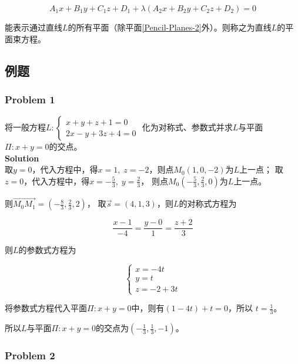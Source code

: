 \documentclass[12pt, a4paper]{article}
\numberwithin{equation}{section}
\begin{document}
    \begin{equation}
        A_1 x+B_1 y+C_1 z+D_1+\lambda\left(A_2x+B_2y+C_2z+D_2\right) = 0
    \end{equation}

    能表示通过直线\(L\)的所有平面（除平面\ref{Pencil-Planes-2}外）。则称之为直线\(L\)的平面束方程。

\subsection{例题}

\subsubsection{Problem 1}

    将一般方程$L:\left\{\begin{array}{l}x+y+z+1=0 \\ 2 x-y+3z+4=0\end{array}\right.$
    化为对称式、参数式并求\(L\)与平面\(\Pi: x + y =0\)的交点。
    \\

    \textbf{Solution}
    \\

    取\(y = 0\)，代入方程中，得\(x=1,\; z=-2\)，则点\(M_{0}\left(1,0,-2\right)\)为\(L\)上一点；
    取\(z = 0\)，代入方程中，得\(x=-\frac{5}{3},\; y=\frac{2}{3}\)，
    则点\(M_{0}\left(-\frac{5}{3},\frac{2}{3},0\right)\)为\(L\)上一点。

    则\(\overrightarrow{M_{0}M_{1}} = \left(-\frac{8}{3},\frac{2}{3},2\right)\)，
    取\(\overrightarrow{s} = \left(4,1,3\right)\)，则\(L\)的对称式方程为

    \[
        \frac{x-1}{-4}=\frac{y-0}{1}=\frac{z+2}{3}
    \]

    则\(L\)的参数式方程为

    $$
        \left\{\begin{array}{l}
        x=-4 t \\
        y=t \\
        z=-2+3 t
        \end{array}\right.
    $$

    将参数式方程代入平面\(\Pi: x + y =0\)中，则有\(\left(1-4t\right) + t = 0\)，所以
    \(t = \frac{1}{3}\)。

    所以\(L\)与平面\(\Pi: x + y =0\)的交点为\(\left(-\frac{1}{3},\frac{1}{3},-1\right)\)。

\subsubsection{Problem 2}
\end{document}
